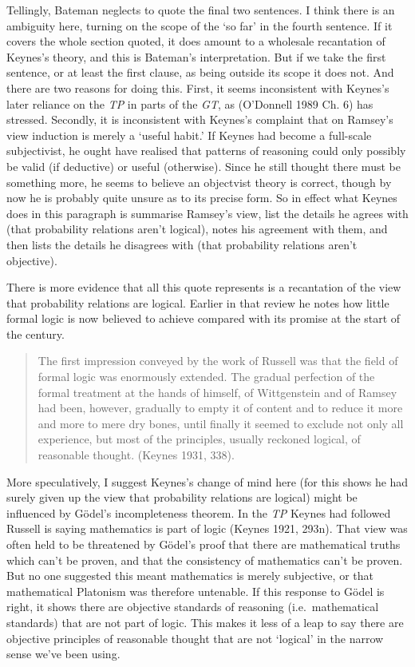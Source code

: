 \documentclass[noflushend]{philosophersimprint}
\begin{document}
Tellingly, Bateman neglects to quote the final two sentences. I think
there is an ambiguity here, turning on the scope of the `so far' in the
fourth sentence. If it covers the whole section quoted, it does amount
to a wholesale recantation of Keynes's theory, and this is Bateman's
interpretation. But if we take the first sentence, or at least the first
clause, as being outside its scope it does not. And there are two
reasons for doing this. First, it seems inconsistent with Keynes's later
reliance on the \emph{TP} in parts of the \emph{GT}, as (O'Donnell 1989
Ch. 6) has stressed. Secondly, it is inconsistent with Keynes's
complaint that on Ramsey's view induction is merely a `useful habit.' If
Keynes had become a full-scale subjectivist, he ought have realised that
patterns of reasoning could only possibly be valid (if deductive) or
useful (otherwise). Since he still thought there must be something more,
he seems to believe an objectvist theory is correct, though by now he is
probably quite unsure as to its precise form. So in effect what Keynes
does in this paragraph is summarise Ramsey's view, list the details he
agrees with (that probability relations aren't logical), notes his
agreement with them, and then lists the details he disagrees with (that
probability relations aren't objective).

There is more evidence that all this quote represents is a recantation
of the view that probability relations are logical. Earlier in that
review he notes how little formal logic is now believed to achieve
compared with its promise at the start of the century.

\begin{quote}
The first impression conveyed by the work of Russell was that the field
of formal logic was enormously extended. The gradual perfection of the
formal treatment at the hands of himself, of Wittgenstein and of Ramsey
had been, however, gradually to empty it of content and to reduce it
more and more to mere dry bones, until finally it seemed to exclude not
only all experience, but most of the principles, usually reckoned
logical, of reasonable thought. (Keynes 1931, 338).
\end{quote}

More speculatively, I suggest Keynes's change of mind here (for this
shows he had surely given up the view that probability relations are
logical) might be influenced by Gödel's incompleteness theorem. In the
\emph{TP} Keynes had followed Russell is saying mathematics is part of
logic (Keynes 1921, 293n). That view was often held to be threatened by
Gödel's proof that there are mathematical truths which can't be proven,
and that the consistency of mathematics can't be proven. But no one
suggested this meant mathematics is merely subjective, or that
mathematical Platonism was therefore untenable. If this response to
Gödel is right, it shows there are objective standards of reasoning
(i.e.~mathematical standards) that are not part of logic. This makes it
less of a leap to say there are objective principles of reasonable
thought that are not `logical' in the narrow sense we've been using.
\end{document}
